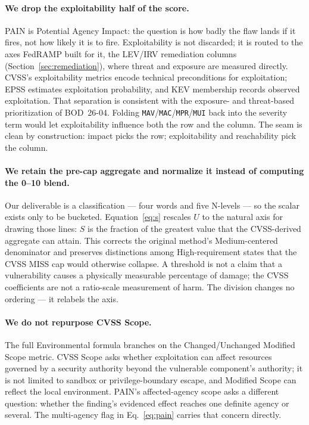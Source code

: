 \documentclass[11pt]{article}
\newcommand{\code}[1]{\texttt{#1}}
\begin{document}
\paragraph{We drop the exploitability half of the score.}
PAIN is Potential Agency Impact: the question is how badly the flaw lands if it
fires, not how likely it is to fire. Exploitability is not discarded; it is routed
to the axes FedRAMP built for it, the LEV/IRV remediation columns
(Section~\ref{sec:remediation}), where threat and exposure are measured directly.
CVSS's exploitability metrics encode technical preconditions for exploitation;
EPSS estimates exploitation probability, and KEV membership records observed
exploitation. That separation is consistent with the exposure- and threat-based
prioritization of BOD~26-04. Folding
\code{MAV}/\code{MAC}/\code{MPR}/\code{MUI} back into the severity term would let
exploitability influence both the row and the column. The seam is clean by
construction: impact picks the row; exploitability and reachability pick the
column.

\paragraph{We retain the pre-cap aggregate and normalize it instead of computing
the 0--10 blend.}
Our deliverable is a classification --- four words and five N-levels --- so the
scalar exists only to be bucketed. Equation~\eqref{eq:s} rescales $U$ to the
natural axis for drawing those lines: $S$ is the fraction of the greatest value
that the CVSS-derived aggregate can attain. This corrects the original method's
Medium-centered denominator and preserves distinctions among High-requirement
states that the CVSS MISS cap would otherwise collapse. A threshold is not a
claim that a vulnerability causes a physically measurable percentage of damage;
the CVSS coefficients are not a ratio-scale measurement of harm. The division
changes no ordering --- it relabels the axis.

\paragraph{We do not repurpose CVSS Scope.}
\label{sec:cvss-scope}
The full Environmental formula branches on the Changed/Unchanged Modified Scope
metric. CVSS Scope asks whether exploitation can affect resources governed by a
security authority beyond the vulnerable component's authority; it is not limited
to sandbox or privilege-boundary escape, and Modified Scope can reflect the local
environment. PAIN's affected-agency scope asks a different question: whether the
finding's evidenced effect reaches one definite agency or several. The
multi-agency flag in Eq.~\eqref{eq:pain} carries that concern directly.
\end{document}
